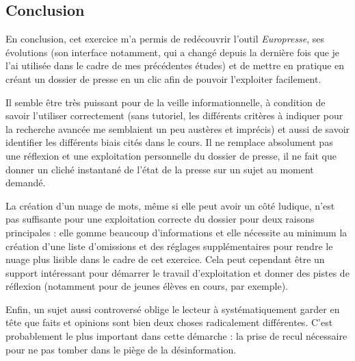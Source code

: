 \subsection{Conclusion}
En conclusion, cet exercice m'a permis de redécouvrir l'outil \textit{Europresse}, ses évolutions (son interface notamment, qui a changé depuis la dernière fois que je l'ai utilisée dans le cadre de mes précédentes études) et de mettre en pratique en créant un dossier de presse en un clic afin de pouvoir l'exploiter facilement.

Il semble être très puissant pour de la veille informationnelle, à condition de savoir l'utiliser correctement (sans tutoriel, les différents critères à indiquer pour la recherche avancée me semblaient un peu austères et imprécis) et aussi de savoir identifier les différents biais cités dans le cours. Il ne remplace absolument pas une réflexion et une exploitation personnelle du dossier de presse, il ne fait que donner un cliché instantané de l'état de la presse sur un sujet au moment demandé.

La création d'un nuage de mots, même si elle peut avoir un côté ludique, n'est pas suffisante pour une exploitation correcte du dossier pour deux raisons principales : elle gomme beaucoup d'informations et elle nécessite au minimum la création d'une liste d'omissions et des réglages supplémentaires pour rendre le nuage plus lisible dans le cadre de cet exercice. Cela peut cependant être un support intéressant pour démarrer le travail d'exploitation et donner des pistes de réflexion (notamment pour de jeunes élèves en cours, par exemple).

Enfin, un sujet aussi controversé oblige le lecteur à systématiquement garder en tête que faits et opinions sont bien deux choses radicalement différentes. C'est probablement le plus important dans cette démarche : la prise de recul nécessaire pour ne pas tomber dans le piège de la désinformation.

